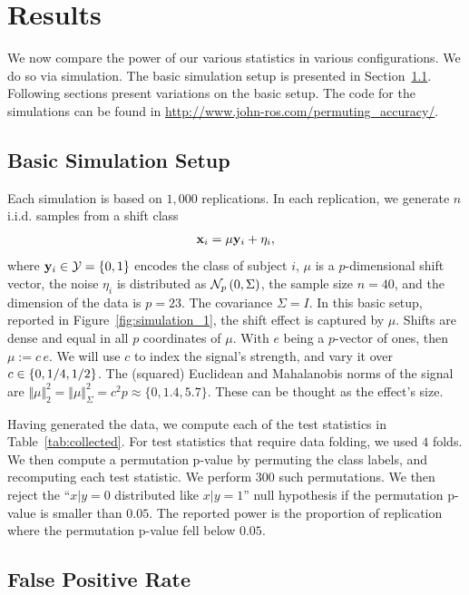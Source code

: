 \documentclass[journal]{IEEEtran}
\begin{document}
\section{Results}
\label{sec:results}
We now compare the power of our various statistics in various configurations. 
We do so via simulation.
The basic simulation setup is presented in Section~\ref{sec:simulation_details}.
Following sections present variations on the basic setup.
The \R code for the simulations can be found in \url{http://www.john-ros.com/permuting_accuracy/}.


\subsection{Basic Simulation Setup}
\label{sec:simulation_details}

Each simulation is based on $1,000$ replications. 
In each replication, we generate $n$ i.i.d. samples from a shift class 
\begin{align}
\label{eq:distribution}
\x_i = \mu \y_i + \eta_i,
\end{align}
where $\mathbf{y}_i \in \mathcal{Y}=\{ 0,1 \}$ encodes the class of subject $i$, $\mu$ is a $p$-dimensional shift vector, the noise $\eta_i$ is distributed as $\mathcal{N}_{p}\left(0,\Sigma\right)$, the sample size $n=40$, and the dimension of the data is $p=23$. 
The covariance $\Sigma=I$. 
In this basic setup, reported in Figure~\ref{fig:simulation_1}, the shift effect is captured by $\mu$. 
Shifts are dense and equal in all $p$ coordinates of $\mu$.
With $e$ being a $p$-vector of ones, then $\mu:=c \, e$. 
We will use $c$ to index the signal's strength, and vary it over $c \in \{ 0,1/4,1/2 \}$.
The (squared) Euclidean and Mahalanobis norms of the signal are $\Vert \mu \Vert_2^2=\Vert \mu \Vert_\Sigma^2=c^2 p\approx \{0,1.4,5.7\}$.
These can be thought as the effect's size. 


Having generated the data, we compute each of the test statistics in Table~\ref{tab:collected}.
For test statistics that require data folding, we used $4$ folds. 
We then compute a permutation p-value by permuting the class labels, and recomputing each test statistic. 
We perform $300$ such permutations. 
We then reject the ``$x|y=0$ distributed like $x|y=1$'' null hypothesis if the permutation p-value is smaller than $0.05$.
The reported power is the proportion of replication where the permutation p-value fell below $0.05$.



\subsection{False Positive Rate}
\label{sec:type_i}
\end{document}
